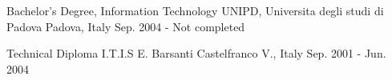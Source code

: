 

\begin{cventries}

  \cventry
    {Bachelor's Degree, Information Technology} %
    {UNIPD, Universita degli studi di Padova} %
    {Padova, Italy} %
    {Sep. 2004 - Not completed} %
    {
    }
  \vspace{-5mm}

  \cventry
    {Technical Diploma} %
    {I.T.I.S E. Barsanti} %
    {Castelfranco V., Italy} %
    {Sep. 2001 - Jun. 2004} %
    {
    }
  \vspace{-5mm}

\end{cventries}
